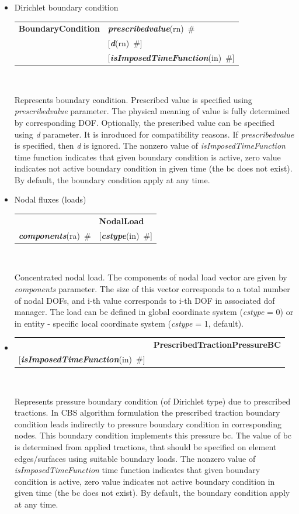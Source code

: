 \documentclass[a4paper]{article}
\makeatletter
\newcommand{\param}[1]{{\em #1}}
\newcommand{\keywordnotype}[1]{\mbox{{\it{\bf{#1}}}}}
\newcommand{\keyword}[2]{\mbox{{\keywordnotype{#1}\tiny (#2)}}}
\newcommand{\entKeywordInst}[1]{\mbox{{\bf{{#1}}}}}
\newcommand{\field}[2]{\mbox{\keyword{#1}{#2}~\#}}
\newcommand{\optField}[2]{\mbox{[\field{#1}{#2}]}}
\newenvironment{record}[1][]{\begin{tabular}{|ll}}{\end{tabular}\\}
\newcommand{\recentry}[2]{{#1}&{#2}\\}
\newcounter{rcc}
\newenvironment{record}[1][\textwidth]{\setcounter{rcc}{0}\begin{tabular*}{#1}{|ll@{\extracolsep{\fill}}r}}{\end{tabular*}\\}
\newcommand{\recentry}[2]{\ifthenelse{\value{rcc}>0}{&$\backslash$ \\}{\setcounter{rcc}{1}}{#1}&{#2}}
\makeatother
\begin{document}
\begin{itemize}
\item Dirichlet boundary condition

  \noindent
  \begin{record}[0.9\textwidth]
    \recentry{\entKeywordInst{BoundaryCondition}}{\field{prescribedvalue}{rn}}
    \recentry{}{\optField{d}{rn}}
    \recentry{}{\optField{is\-Impo\-sed\-Ti\-me\-Fun\-ction}{in}}
  \end{record}

  Represents boundary condition. 
Prescribed value is specified using \param{prescribedvalue} parameter. The
physical meaning of value is fully determined by corresponding DOF.
Optionally, the prescribed value can be specified using \param{d}
parameter. It is inroduced for compatibility reasons. If
\param{prescribedvalue} is specified, then \param{d} is ignored.
The nonzero value of \param{isImposedTimeFunction} time function
indicates that given boundary condition is active, zero value
indicates not active boundary condition in given time (the bc does not
exist). By default, the boundary condition apply at any time.
\item Nodal fluxes (loads)

\noindent
\begin{record}[0.9\textwidth]
  \recentry{}{\entKeywordInst{NodalLoad}}{\field{components}{ra}} \recentry{}{\optField{cstype}{in}}
\end{record}

Concentrated nodal load. The components of nodal load vector 
are given by \param{components} parameter. The size of this vector
corresponds to a total number of nodal DOFs, and i-th value
corresponds to i-th DOF in associated dof manager. The load can be defined in global coordinate system (\param{cstype} =
0) or in entity - specific local coordinate system
(\param{cstype} = 1, default).
\item \mbox{}

\noindent
\begin{record}[0.9\textwidth]
  \recentry{}{\entKeywordInst{PrescribedTractionPressureBC}}{\optField{is\-Impo\-sed\-Ti\-me\-Fun\-ction}{in}}
\end{record}

Represents pressure boundary condition (of Dirichlet type) due to
prescribed tractions. 
In CBS algorithm formulation the prescribed traction
boundary condition leads indirectly to pressure boundary condition in
corresponding nodes. This boundary condition implements this pressure
bc. The value of bc is determined from applied tractions, that  should be specified on element edges/surfaces using 
suitable boundary loads.
The nonzero value of \param{isImposedTimeFunction} time function
indicates that given boundary condition is active, zero value
indicates not active boundary condition in given time (the bc does not
exist). By default, the boundary condition apply at any time.
\end{itemize}
\end{document}
